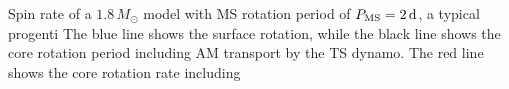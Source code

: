  \label{fig:MRI1.8rot} Spin rate of a $1.8 \, M_\odot$ model with MS rotation period of $P_{\rm MS} = 2 \, {\rm d}$, a typical progenti The blue line shows the surface rotation, while the black line shows the core rotation period including AM transport by the TS dynamo. The red line shows the core rotation rate including